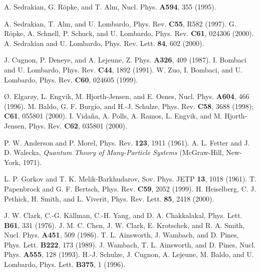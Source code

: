 \documentclass[runningheads]{svmult}
\begin{document}
\begin{thebibliography}{}
 A. Sedrakian, G. R\"opke, and T. Alm,
 Nucl. Phys. {\bf A594}, 355 (1995).

 A. Sedrakian, T. Alm, and U. Lombardo, 
 Phys. Rev. {\bf C55}, R582 (1997).
 G. R\"opke, A. Schnell, P. Schuck, and U. Lombardo,
 Phys. Rev. {\bf C61}, 024306 (2000).
 A. Sedrakian and U. Lombardo, 
 Phys. Rev. Lett. {\bf 84}, 602 (2000). 

 J. Cugnon, P. Deneye, and A. Lejeune,
 Z. Phys. {\bf A326}, 409 (1987).
 I. Bombaci and U. Lombardo,
 Phys. Rev. {\bf C44}, 1892 (1991).
 W. Zuo, I. Bombaci, and U. Lombardo, 
 Phys. Rev. {\bf C60}, 024605 (1999).

 \O. Elgar\o y, L. Engvik, M. Hjorth-Jensen, and E. Osnes, 
 Nucl. Phys. {\bf A604}, 466 (1996).
 M. Baldo, G. F. Burgio, and H.-J. Schulze,
 Phys. Rev. {\bf C58}, 3688 (1998); {\bf C61}, 055801 (2000).  
 I. Vida\~na, A. Polls, A. Ramos, L. Engvik, and M. Hjorth-Jensen,
 Phys. Rev. {\bf C62}, 035801 (2000).  

 P. W. Anderson and P. Morel, 
 Phys. Rev. {\bf 123}, 1911 (1961).
 A. L. Fetter and J. D. Walecka, 
 {\it Quantum Theory of Many-Particle Systems} 
 (McGraw-Hill, New-York, 1971).

 L. P. Gorkov and T. K. Melik-Barkhudarov, 
 Sov. Phys. JETP {\bf 13}, 1018 (1961).
 T. Papenbrock and G. F. Bertsch,
 Phys. Rev. {\bf C59}, 2052 (1999).
 H. Heiselberg, C. J. Pethick, H. Smith, and L. Viverit,
 Phys. Rev. Lett. {\bf 85}, 2418 (2000).

 J. W. Clark, C.-G. K\"allman, C.-H. Yang, and D. A. Chakkalakal,
 Phys. Lett. {\bf B61}, 331 (1976).
 J. M. C. Chen, J. W. Clark, E. Krotschek, and R. A. Smith,
 Nucl. Phys. {\bf A451}, 509 (1986).
 T. L. Ainsworth, J. Wambach, and D. Pines,
 Phys. Lett. {\bf B222}, 173 (1989).
 J. Wambach, T. L. Ainsworth, and D. Pines,
 Nucl. Phys. {\bf A555}, 128 (1993).
 H.-J. Schulze, J. Cugnon, A. Lejeune, M. Baldo, and U. Lombardo,
 Phys. Lett. {\bf B375}, 1 (1996).


\end{thebibliography}
\end{document}
